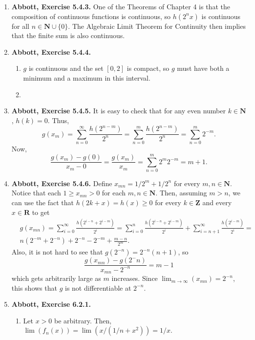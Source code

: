 \documentclass{article}
\newcommand{\N}{\mathbf{N}}
\newcommand{\Z}{\mathbf{Z}}
\newcommand{\R}{\mathbf{R}}
\newcommand{\set}[1]{\{#1\}}
\newcommand{\exc}[2][Abbott]{\item \textbf{#1, Exercise #2.}}
\begin{document}
\begin{enumerate}
    \exc{5.4.3}
    One of the Theorems of Chapter 4 is that the composition of continuous functions is continuous, so $h(2^n x)$ is continuous for all $n \in \N \cup \set{0}$. The Algebraic Limit Theorem for Continuity then implies that the finite sum is also continuous.
    
    \exc{5.4.4}
    \begin{enumerate}
        \item $g$ is continuous and the set $[0, 2]$ is compact, so $g$ must have both a minimum and a maximum in this interval.
        
        \item 
    \end{enumerate}
    
    \exc{5.4.5}
    It is easy to check that for any even number $k \in \N$, $h(k) = 0$. Thus,
    \begin{equation*}
       g(x_m) = \sum_{n=0}^\infty \frac{h(2^{n-m})}{2^n} = \sum_{n=0}^m \frac{h(2^{n-m})}{2^n} = \sum_{n=0}^m 2^{-m}.
    \end{equation*} Now,
    \begin{equation*}
        \frac{g(x_m)-g(0)}{x_m-0} = \frac{g(x_m)}{x_m} = \sum_{n=0}^m 2^m 2^{-m} = m+1.
    \end{equation*}
    
    \exc{5.4.6}
    Define $x_{m n} = 1/2^m + 1/2^n$ for every $m,n \in \N$. Notice that each $1 \geq x_{m n} > 0$ for each $m,n \in \N$. Then, assuming $m > n$, we can use the fact that $h(2k + x) = h(x) \geq 0$ for every $k \in \Z$ and every $x \in \R$ to get
    \begin{align*}
        &g(x_{m n}) = \sum_{i = 0}^\infty \frac{h(2^{i-n}+2^{i-m})}{2^i} = 
        \sum_{i = 0}^n \frac{h(2^{i-n}+2^{i-m})}{2^i} + \sum_{i=n+1}^\infty \frac{h(2^{i-m})}{2^i} = \\
        & n (2^{-m}+2^{-n})+2^{-n}-2^{-m} + \frac{m-n}{2^m}.
    \end{align*} Also, it is not hard to see that $g(2^{-n}) = 2^{-n}(n+1)$, so 
    \begin{equation*}
        \frac{g(x_{m n})-g(2^-n)}{x_{m n} - 2^{-n}} = m-1
    \end{equation*} which gets arbitrarily large as $m$ increases. Since $\lim_{m \to \infty} (x_{m n}) = 2^{-n}$, this shows that $g$ is not differentiable at $2^{-n}$.

    \exc{6.2.1}
    \begin{enumerate}
        \item Let $x > 0$ be arbitrary. Then, $\lim (f_n(x)) = \lim (x/(1/n+x^2)) = 1/x$.
        

\end{enumerate}
\end{enumerate}
\end{document}
